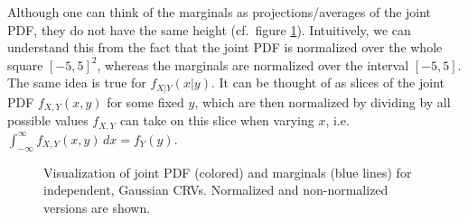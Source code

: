 \addtocounter{footnote}{-1}
\addtocounter{footnote}{1}
Although one can think of the marginals as projections/averages of the joint PDF, they do not have the same height (cf.~figure \ref{fig:joint_marginal_PDF}). Intuitively, we can understand this from the fact that the joint PDF is normalized over the whole square $[-5, 5]^2$, whereas the marginals are normalized over the interval $[-5, 5]$. The same idea is true for $f_{X | Y}(x | y)$. It can be thought of as slices of the joint PDF $f_{X, Y}(x, y)$ for some fixed $y$, which are then normalized by dividing by all possible values $f_{X, Y}$ can take on this slice when varying $x$, i.e.~$\int_{- \infty}^\infty f_{X, Y}(x, y) \, dx = f_Y(y)$.



\begin{figure}
\centering


%
\hspace{0.04\textwidth}%
%


\caption{Visualization of joint PDF (colored) and marginals (blue lines) for independent, Gaussian CRVs. Normalized and non-normalized versions are shown.}
\label{fig:joint_marginal_PDF}
\end{figure}



